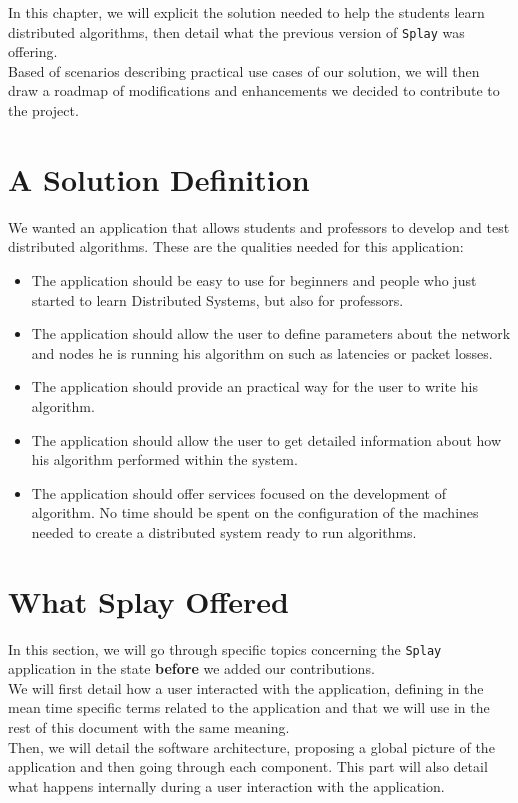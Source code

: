 \documentclass{eplmastersthesis}
\begin{document}
    In this chapter, we will explicit the solution needed to help the
    students learn distributed algorithms, then detail what the previous
    version of \texttt{Splay} was offering.\\
    Based of scenarios describing practical use cases of our solution, we will
    then draw a roadmap of modifications and enhancements we decided to
    contribute to the project.

    \section{A Solution Definition}

      We wanted an application that allows students and professors to develop
      and test distributed algorithms. These are the qualities needed for this
      application:

      \begin{itemize}
        \item The application should be easy to use for beginners and people
        who just started to learn Distributed Systems, but also for professors.
        \item The application should allow the user to define parameters about
        the network and nodes he is running his algorithm on such as latencies
        or packet losses.
        \item The application should provide an practical way for the user
        to write his algorithm.
        \item The application should allow the user to get detailed information
        about how his algorithm performed within the system.
        \item The application should offer services focused on the development
        of algorithm. No time should be spent on the configuration of the
        machines needed to create a distributed system ready to run algorithms.
      \end{itemize}

    \section{What Splay Offered}

      In this section, we will go through specific topics concerning the \texttt{Splay}
      application in the state \textbf{before} we added our contributions.\\
      We will first detail how a user interacted with the application,
      defining in the mean time specific terms related to
      the application and that we will use in the rest of this document with
      the same meaning.\\
      Then, we will detail the software architecture, proposing a global
      picture of the application and then going through each component. This
      part will also detail what happens internally during a user interaction
      with the application.
\end{document}
